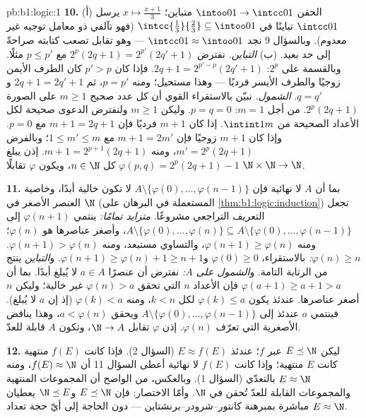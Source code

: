 \begin{solution}{pb:b1:logic:1}
\textbf{10.} (أ) الحقن $\intoo01 \to \intcc01$ متباين؛
 $x \mapsto \frac{x + 1}3$ يرسل $\intcc01$ تباينًا في
$\intcc{\frac13}{\frac23} \subseteq \intoo01$ (فهو تآلفي ذو معامل توجيه
غير معدوم). وبالسؤال 9 نجد $\intcc01 \approx \intoo01$ --- وهو
تقابل تصعب كتابته صراحةً إلى حد بعيد.
(ب) \emph{التباين.} نفترض $2^p(2q + 1) = 2^{p'}(2q' + 1)$ مع
$p \leq p'$ مثلًا. وبالقسمة على $2^p$: $2q + 1 = 2^{p' - p}(2q' + 1)$.
فإذا كان $p' > p$ كان الطرف الأيمن زوجيًا والطرف الأيسر فرديًا ---
وهذا مستحيل؛ ومنه $p = p'$، ثم $2q + 1 = 2q' + 1$ و $q = q'$.
\emph{الشمول.} نبيّن بالاستقراء القوي أن كل عدد صحيح
$m \geq 1$ على الصورة $2^p(2q + 1)$. من أجل $m = 1$: $p = q = 0$.
وليكن $m \geq 1$ ولنفترض الدعوى صحيحة لكل الأعداد الصحيحة من
$\intint1m$. إذا كان $m + 1$ فرديًا فإن $m + 1 = 2q + 1$ مع $p = 0$.
وإذا كان $m + 1$ زوجيًا فإن $m + 1 = 2m'$ مع $1 \leq m' \leq m$؛
وبالفرض $m' = 2^p(2q + 1)$، ومنه $m + 1 = 2^{p+1}(2q + 1)$. إذن
يبلغ $\varphi(p, q) = 2^p(2q + 1) - 1$ كل $n \in \N$، ويكون
$\varphi$ تقابلًا $\N \times \N \to \N$.

\textbf{11.} بما أن $A$ لا نهائية فإن $A \setminus \{\varphi(0), \dots,
\varphi(n - 1)\}$ لا تكون خالية أبدًا، وخاصية العنصر الأصغر في
$\N$ (المستعملة في البرهان على \cref{thm:b1:logic:induction}) تجعل
التعريف التراجعي مشروعًا. \emph{متزايد تمامًا:}
ينتمي $\varphi(n + 1)$ إلى $A \setminus \{\varphi(0), \dots,
\varphi(n)\} \subseteq A \setminus \{\varphi(0), \dots, \varphi(n -
1)\}$، وأصغر عناصرها هو $\varphi(n)$؛ ومنه $\varphi(n + 1) \geq
\varphi(n)$، والتساوي مستبعد، ومنه $\varphi(n+1) >
\varphi(n)$. \emph{$\varphi(n) \geq n$:} بالاستقراء، $\varphi(0)
\geq 0$ و$\varphi(n + 1) \geq \varphi(n) + 1 \geq n + 1$.
و\emph{التباين} ينتج من الرتابة التامة.
و\emph{الشمول على $A$:} نفترض أن عنصرًا $a \in A$ لا يُبلغ أبدًا.
بما أن $\varphi(a + 1) \geq a + 1 > a$ فإن  الأعداد $n$ التي تحقق
$\varphi(n) > a$ غير خالية؛ وليكن $n$ أصغر عناصرها. عندئذ يكون
$\varphi(k) \leq a$ لكل $k < n$، ومنه $\varphi(k) < a$ (إذ إن $a$ لا
يُبلغ). فينتمي $a$ عندئذ إلى $A \setminus \{\varphi(0), \dots,
\varphi(n - 1)\}$ ويحقق $a < \varphi(n)$، وهذا يناقض الأصغرية التي
تعرّف $\varphi(n)$. إذن $\varphi$ تقابل $\N \to A$، وتكون
$A$ قابلة للعدّ.

\textbf{12.} ليكن $E \preceq \N$ عبر  $f$؛ عندئذ $E \approx
f(E)$ (السؤال 2). فإذا كانت $f(E)$ منتهية كانت $E$ منتهية؛ وإذا
كانت $f(E)$ لا نهائية أعطى السؤال 11 أن $f(E) \approx \N$، ومنه
$E \approx \N$ بالتعدّي (السؤال 1). وبالعكس، من الواضح أن المجموعات
المنتهية والمجموعات القابلة للعدّ تُحقن في $\N$. وأمّا الاختصار: فإن
$E \preceq \N$ و$\N
\preceq E$ يعطيان $E \approx \N$ مباشرة بمبرهنة
كانتور--شرودر--برنشتاين --- دون الحاجة إلى أيّ حجة تعداد.


\end{solution}
